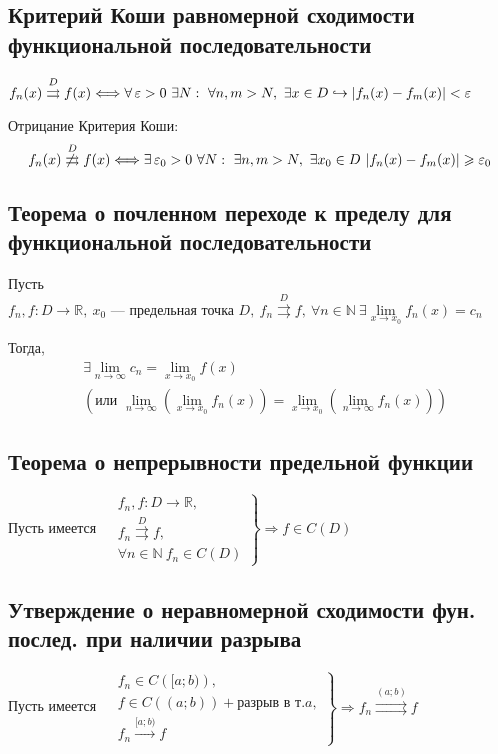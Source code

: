 \documentclass[a4paper]{article}
\begin{document}
\subsection{Критерий Коши равномерной сходимости функциональной последовательности}
\theorem $f_n(x)\overset{D}{\rightrightarrows} f(x)\Longleftrightarrow\forall\ve>0\ \exists N:\ \forall n,m>N,\ \exists x\in D\hookrightarrow |f_n(x)-f_m(x)|<\ve$

\comment Отрицание Критерия Коши: 
\begin{equation*}
    f_n(x)\not\overset{D}{\rightrightarrows} f(x)\Longleftrightarrow\exists\ve_0>0\ \forall N:\ \exists n,m>N,\ \exists x_0\in D\ |f_n(x)-f_m(x)|\geqslant\ve_0
\end{equation*}

\subsection{Теорема о почленном переходе к пределу для функциональной последовательности}
\theorem Пусть $f_n,f: D\longrightarrow\mathbb{R},\ x_0\text{ — предельная точка } D,\ f_n\overset{D}{\rightrightarrows} f,\ \forall n\in\mathbb{N}\ \exists\lim\limits_{x\to x_0} f_n(x)=c_n$

Тогда,
\begin{equation*}
    \begin{aligned}
        &\exists\lim\limits_{n\to\infty} c_n=\lim\limits_{x\to x_0} f(x)\\
        &\left(\text{или }\lim\limits_{n\to\infty} \left(\lim_{x\to x_0} f_n(x)\right)=\lim_{x\to x_0}\left(\lim_{n\to\infty} f_n(x)\right)\right)
    \end{aligned}
\end{equation*}

\subsection{Теорема о непрерывности предельной функции}
\theorem Пусть имеется $\left.\begin{aligned}
    &f_n,f: D\longrightarrow\mathbb{R},\\
    &f_n\overset{D}{\rightrightarrows} f,\\
    &\forall n\in\mathbb{N}\ f_n\in C(D)
\end{aligned}\right\}\Longrightarrow f\in C(D)$

\subsection{Утверждение о неравномерной сходимости фун. послед. при наличии разрыва}
\theorem Пусть имеется $\left.\begin{aligned}
    &f_n\in C\left([a;b)\right),\\
    &f\in C((a;b))+\text{разрыв в т.}a,\\
    &f_n\overset{[a;b)}{\longrightarrow} f
\end{aligned}\right\}\Longrightarrow f_n\overset{(a;b)}{\rightrightarrows} f$
\end{document}
